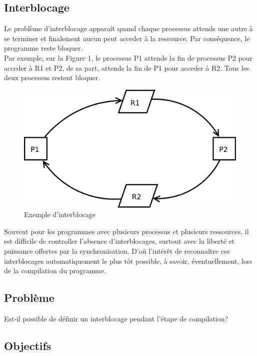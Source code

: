 \documentclass[12pt]{report}
\begin{document}
\subsection{Interblocage}

Le problème d'interblocage apparaît quand chaque processus attends une autre à se terminer et finalement aucun peut acceder à la ressource.
Par conséquence, le programme reste bloquer.\\
Par exemple, sur la Figure 1, le processus P1 attends la fin de processus P2 pour acceder à R1 et P2, de sa part, attends la fin de P1 pour acceder à R2. Tous les deux processus restent bloquer.\\

\begin{figure}[h]
  \includegraphics[scale=0.2]{deadlock}
  \centering
  \caption{Exemple d'interblocage}
  \centering
\end{figure}

Souvent pour les programmes avec plusieurs processus et plusieurs ressources, il est difficile de controller l'absence d'interblocages, surtout avec la liberté et puissance offertes par la synchronisation.
D'où l'intérêt de reconnaître ces interblocages automatiquement le plus tôt possible, à savoir, éventuellement, lors de la compilation du programme.

\newpage

\subsection{Problème}

Est-il possible de définir un interblocage pendant l'étape de compilation?

 \subsection{Objectifs}
\end{document}
